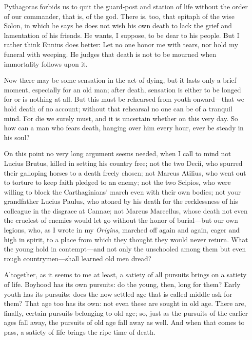  Pythagoras forbids us to quit the guard-post and station of life without the order of our commander, that is, of the god. There is, too, that epitaph of the wise Solon, in which he says he does not wish his own death to lack the grief and lamentation of his friends. He wants, I suppose, to be dear to his people. But I rather think Ennius does better: Let no one honor me with tears, nor hold my funeral with weeping. He judges that death is not to be mourned when immortality follows upon it.

 Now there may be some sensation in the act of dying, but it lasts only a brief moment, especially for an old man; after death, sensation is either to be longed for or is nothing at all. But this must be rehearsed from youth onward—that we hold death of no account; without that rehearsal no one can be of a tranquil mind. For die we surely must, and it is uncertain whether on this very day. So how can a man who fears death, hanging over him every hour, ever be steady in his soul?

 On this point no very long argument seems needed, when I call to mind not Lucius Brutus, killed in setting his country free; not the two Decii, who spurred their galloping horses to a death freely chosen; not Marcus Atilius, who went out to torture to keep faith pledged to an enemy; not the two Scipios, who were willing to block the Carthaginians' march even with their own bodies; not your grandfather Lucius Paulus, who atoned by his death for the recklessness of his colleague in the disgrace at Cannae; not Marcus Marcellus, whose death not even the cruelest of enemies would let go without the honor of burial—but our own legions, who, as I wrote in my \textit{Origins}, marched off again and again, eager and high in spirit, to a place from which they thought they would never return. What the young hold in contempt—and not only the unschooled among them but even rough countrymen—shall learned old men dread?

 Altogether, as it seems to me at least, a satiety of all pursuits brings on a satiety of life. Boyhood has its own pursuits: do the young, then, long for them? Early youth has its pursuits: does the now-settled age that is called middle ask for them? That age too has its own: not even these are sought in old age. There are, finally, certain pursuits belonging to old age; so, just as the pursuits of the earlier ages fall away, the pursuits of old age fall away as well. And when that comes to pass, a satiety of life brings the ripe time of death.

